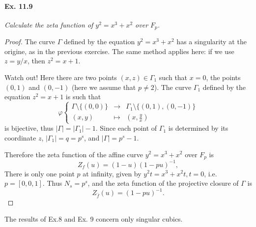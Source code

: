 \documentclass[11pt,a4paper]{article}
\begin{document}
\paragraph{Ex. 11.9}{\it Calculate the zeta function of $y^2 = x^3 + x^2$ over $F_p$.
}
\begin{proof}
The curve $\Gamma$ defined by the  equation $y^2 = x^3 + x^2$ has a singularity at the origine, as in the previous exercise. The same method applies here: if we use $z= y/x$, then $z^2 = x+1$.

Watch out! Here there are two points $(x,z) \in \Gamma_1$ such that $x= 0$, the points $(0,1)$ and $(0,-1)$ (here we assume that $p\ne 2$).
The curve $\Gamma_1$ defined by the equation $z^2 = x+ 1$ is such that 
$$
\varphi
\left\{
\begin{array}{ccl}
\Gamma \setminus \{(0,0)\}  & \to &\Gamma_1\setminus \{(0,1),(0,-1)\} \\
(x,y) & \mapsto & \left(x,\frac{y}{x} \right)
\end{array}
\right.
$$
is bijective, thus $|\Gamma| = |\Gamma_1| - 1$. Since each point of $\Gamma_1$ is determined by its coordinate $z$, $|\Gamma_1| = q = p^s$, and $|\Gamma| = p^s - 1$.

Therefore the zeta function of the affine curve $y^2 = x^3 + x^2$ over $F_p$ is 
$$Z_f(u) = (1-u)(1-pu)^{-1},$$
There is only one point $p$ at infinity, given by $y^2 t = x^3 + x^2 t, t=0$, i.e. $p = [0,0,1]$. Thus $N_s = p^s$, and the zeta function of the projective closure of $\Gamma$ is
$$Z_{\overline{f}}(u) = (1-pu)^{-1}.$$
\end{proof}
The results of Ex.8 and Ex. 9 concern only singular cubics.
\end{document}
